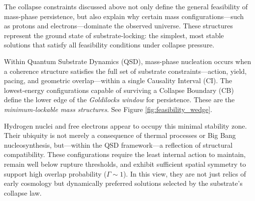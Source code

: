 \documentclass[preprints,article,submit,pdftex,moreauthors]{Definitions/mdpi}
\begin{document}
The collapse constraints discussed above not only define the general feasibility of mass-phase persistence, but also explain why certain mass configurations—such as protons and electrons—dominate the observed universe. These structures represent the ground state of substrate-locking: the simplest, most stable solutions that satisfy all feasibility conditions under collapse pressure.

Within Quantum Substrate Dynamics (QSD), mass-phase nucleation occurs when a coherence structure satisfies the full set of substrate constraints—action, yield, pacing, and geometric overlap—within a single Causality Interval (CI). The lowest-energy configurations capable of surviving a Collapse Boundary (CB) define the lower edge of the \emph{Goldilocks window} for persistence. These are the \emph{minimum-lockable mass structures}. See Figure \ref{fig:feasibility_wedge}.

Hydrogen nuclei and free electrons appear to occupy this minimal stability zone. Their ubiquity is not merely a consequence of thermal processes or Big Bang nucleosynthesis, but—within the QSD framework—a reflection of structural compatibility. These configurations require the least internal action to maintain, remain well below rupture thresholds, and exhibit sufficient spatial symmetry to support high overlap probability (\( \Gamma \sim 1 \)). In this view, they are not just relics of early cosmology but dynamically preferred solutions selected by the substrate’s collapse law.
\end{document}
